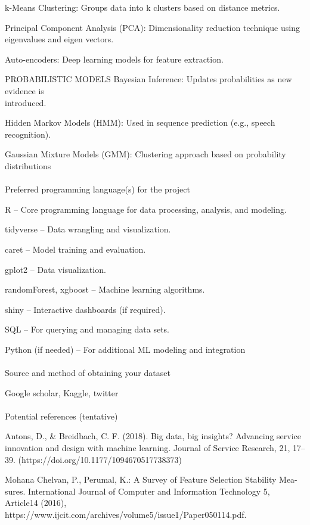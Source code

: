\documentclass[
  letterpaper,
  DIV=11,
  numbers=noendperiod]{scrartcl}
\makeatletter
\let\oldparagraph\paragraph
\renewcommand{\paragraph}{
    \@ifstar
      \xxxParagraphStar
      \xxxParagraphNoStar
  }
\newcommand{\xxxParagraphStar}[1]{\oldparagraph*{#1}\mbox{}}
\newcommand{\xxxParagraphNoStar}[1]{\oldparagraph{#1}\mbox{}}
\makeatother
\begin{document}
k-Means Clustering: Groups data into k clusters based on distance
metrics.

Principal Component Analysis (PCA): Dimensionality reduction technique
using eigenvalues and eigen vectors.

Auto-encoders: Deep learning models for feature extraction.

PROBABILISTIC MODELS Bayesian Inference: Updates probabilities as new
evidence is\\
introduced.

Hidden Markov Models (HMM): Used in sequence prediction (e.g., speech
recognition).

Gaussian Mixture Models (GMM): Clustering approach based on probability
distributions

\paragraph{Preferred programming language(s) for the
project}\label{preferred-programming-languages-for-the-project}

R -- Core programming language for data processing, analysis, and
modeling.

tidyverse -- Data wrangling and visualization.

caret -- Model training and evaluation.

gplot2 -- Data visualization.

randomForest, xgboost -- Machine learning algorithms.

shiny -- Interactive dashboards (if required).

SQL -- For querying and managing data sets.

Python (if needed) -- For additional ML modeling and integration

\paragraph{Source and method of obtaining your
dataset}\label{source-and-method-of-obtaining-your-dataset}

Google scholar, Kaggle, twitter

\paragraph{Potential references
(tentative)}\label{potential-references-tentative}

Antons, D., \& Breidbach, C. F. (2018). Big data, big insights?
Advancing service innovation and design with machine learning. Journal
of Service Research, 21, 17--39.
(https://doi.org/10.1177/1094670517738373)

Mohana Chelvan, P., Perumal, K.: A Survey of Feature Selection Stability
Mea-sures. International Journal of Computer and Information Technology
5, Article14 (2016),
https://www.ijcit.com/archives/volume5/issue1/Paper050114.pdf.
\end{document}
